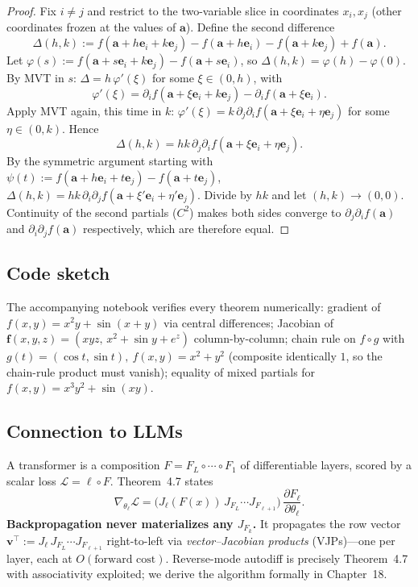 \documentclass[11pt]{article}
\theoremstyle{remark}
\begin{document}
\begin{proof}
Fix $i\neq j$ and restrict to the two-variable slice in coordinates $x_i,x_j$ (other coordinates frozen at the values of $\mathbf{a}$). Define the second difference
\[
\Delta(h,k) := f(\mathbf{a}+h\mathbf{e}_i+k\mathbf{e}_j) - f(\mathbf{a}+h\mathbf{e}_i) - f(\mathbf{a}+k\mathbf{e}_j) + f(\mathbf{a}).
\]
Let $\varphi(s):=f(\mathbf{a}+s\mathbf{e}_i+k\mathbf{e}_j)-f(\mathbf{a}+s\mathbf{e}_i)$, so $\Delta(h,k)=\varphi(h)-\varphi(0)$. By MVT in $s$: $\Delta=h\,\varphi'(\xi)$ for some $\xi\in(0,h)$, with
\[
\varphi'(\xi) = \partial_i f(\mathbf{a}+\xi\mathbf{e}_i+k\mathbf{e}_j) - \partial_i f(\mathbf{a}+\xi\mathbf{e}_i).
\]
Apply MVT again, this time in $k$: $\varphi'(\xi)=k\,\partial_j\partial_i f(\mathbf{a}+\xi\mathbf{e}_i+\eta\mathbf{e}_j)$ for some $\eta\in(0,k)$. Hence
\[
\Delta(h,k) = hk\,\partial_j\partial_i f(\mathbf{a}+\xi\mathbf{e}_i+\eta\mathbf{e}_j).
\]
By the symmetric argument starting with $\psi(t):=f(\mathbf{a}+h\mathbf{e}_i+t\mathbf{e}_j)-f(\mathbf{a}+t\mathbf{e}_j)$, $\Delta(h,k)=hk\,\partial_i\partial_j f(\mathbf{a}+\xi'\mathbf{e}_i+\eta'\mathbf{e}_j)$. Divide by $hk$ and let $(h,k)\to(0,0)$. Continuity of the second partials ($C^2$) makes both sides converge to $\partial_j\partial_i f(\mathbf{a})$ and $\partial_i\partial_j f(\mathbf{a})$ respectively, which are therefore equal.
\end{proof}

\subsection*{Code sketch}

The accompanying notebook verifies every theorem numerically: gradient of $f(x,y)=x^2y+\sin(x+y)$ via central differences; Jacobian of $\mathbf{f}(x,y,z)=(xyz,\,x^2+\sin y+e^z)$ column-by-column; chain rule on $f\circ g$ with $g(t)=(\cos t,\sin t),\ f(x,y)=x^2+y^2$ (composite identically $1$, so the chain-rule product must vanish); equality of mixed partials for $f(x,y)=x^3y^2+\sin(xy)$.

\subsection*{Connection to LLMs}

A transformer is a composition $F = F_L\circ\cdots\circ F_1$ of differentiable layers, scored by a scalar loss $\mathcal{L}=\ell\circ F$. Theorem~4.7 states
\[
\nabla_{\theta_\ell}\mathcal{L} = \big(J_\ell(F(x))\,J_{F_L}\cdots J_{F_{\ell+1}}\big)\,\frac{\partial F_\ell}{\partial \theta_\ell}.
\]
\textbf{Backpropagation never materializes any $J_{F_k}$.} It propagates the row vector $\mathbf{v}^\top := J_\ell\,J_{F_L}\cdots J_{F_{\ell+1}}$ right-to-left via \emph{vector--Jacobian products} (VJPs)---one per layer, each at $O(\text{forward cost})$. Reverse-mode autodiff is precisely Theorem~4.7 with associativity exploited; we derive the algorithm formally in Chapter~18.
\end{document}
